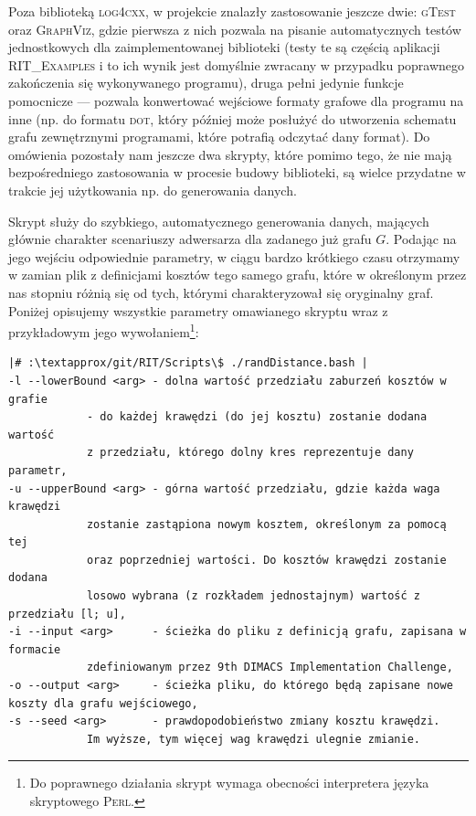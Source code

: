 Poza biblioteką \textsc{log4cxx}, w projekcie znalazły zastosowanie jeszcze dwie: \textsc{gTest} oraz \textsc{GraphViz}, gdzie pierwsza z nich pozwala na pisanie automatycznych testów jednostkowych dla zaimplementowanej biblioteki (testy te są częścią aplikacji \textsc{RIT\_Examples} i to ich wynik jest domyślnie zwracany w przypadku poprawnego zakończenia się wykonywanego programu), druga pełni jedynie funkcje pomocnicze --- pozwala konwertować wejściowe formaty grafowe dla programu na inne (np. do formatu \textsc{dot}, który później może posłużyć do utworzenia schematu grafu zewnętrznymi programami, które potrafią odczytać dany format). Do omówienia pozostały nam jeszcze dwa skrypty, które pomimo tego, że nie mają bezpośredniego zastosowania w procesie budowy biblioteki, są wielce przydatne w trakcie jej użytkowania np. do generowania danych.


Skrypt służy do szybkiego, automatycznego generowania danych, mających głównie charakter scenariuszy adwersarza dla zadanego już grafu $G$. Podając na jego wejściu odpowiednie parametry, w ciągu bardzo krótkiego czasu otrzymamy w zamian plik z definicjami kosztów tego samego grafu, które w określonym przez nas stopniu różnią się od tych, którymi charakteryzował się oryginalny graf. Poniżej opisujemy wszystkie parametry omawianego skryptu wraz z przykładowym jego wywołaniem\footnote{Do poprawnego działania skrypt wymaga obecności interpretera języka skryptowego \textsc{Perl}.}:

\begin{verbatim}
|# :\textapprox/git/RIT/Scripts\$ ./randDistance.bash |
-l --lowerBound <arg> - dolna wartość przedziału zaburzeń kosztów w grafie 
			- do każdej krawędzi (do jej kosztu) zostanie dodana wartość 
			z przedziału, którego dolny kres reprezentuje dany parametr,
-u --upperBound <arg> - górna wartość przedziału, gdzie każda waga krawędzi
			zostanie zastąpiona nowym kosztem, określonym za pomocą tej 
			oraz poprzedniej wartości. Do kosztów krawędzi zostanie dodana 
			losowo wybrana (z rozkładem jednostajnym) wartość z przedziału [l; u],
-i --input <arg>      - ścieżka do pliku z definicją grafu, zapisana w formacie 
			zdefiniowanym przez 9th DIMACS Implementation Challenge,
-o --output <arg>     - ścieżka pliku, do którego będą zapisane nowe koszty dla grafu wejściowego,
-s --seed <arg>       - prawdopodobieństwo zmiany kosztu krawędzi. 
			Im wyższe, tym więcej wag krawędzi ulegnie zmianie.
\end{verbatim}

